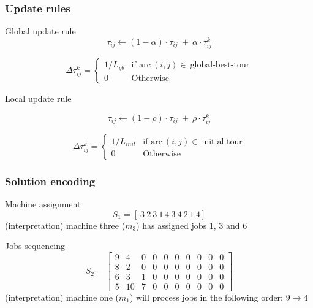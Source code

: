 \begin{frame} \frametitle{Update rules} 

\begin{block}{Global update rule}
\begin{equation*}
\tau_{ij} \leftarrow (1 - \alpha)\cdot\tau_{ij}~+~\alpha\cdot\tau_{ij}^{k}
\end{equation*}

\begin{equation*}
\Delta\tau_{ij}^{k} = 
\begin{cases} 
1/L_{gb} & \text{if arc}~(i,j)\in~\text{global-best-tour} \\
0		 & \text{Otherwise}
\end{cases}
\end{equation*}

\end{block}

\begin{block}{Local update rule}

\begin{equation*}
\tau_{ij} \leftarrow (1 - \rho)\cdot\tau_{ij}~+~\rho\cdot\tau_{ij}^{k}
\end{equation*}

\begin{equation*}
\Delta\tau_{ij}^{k} = 
\begin{cases} 
1/L_{init} 	& \text{if arc}~(i,j)\in~\text{initial-tour} \\
0    		& \text{Otherwise}
\end{cases}
\end{equation*}
\end{block}

\end{frame}


\begin{frame} \frametitle{Solution encoding} 

\begin{block}{Machine assignment}
\begin{equation} \label{eq:stage1} \tag{stage 1}
S_1 =[~3~2~3~1~4~3~4~2~1~4]
\end{equation}
(interpretation) machine three ($m_3$) has assigned jobs 1, 3 and 6
\end{block}

\begin{block}{Jobs sequencing}
\begin{equation}\label{eq:stage2} \tag{stage 2}
S_2 =
\begin{bmatrix}
9  &  4  &  0 &  0 &  0 &  0 &  0 &  0 &  0 &  0 \\
8  &  2  &  0 &  0 &  0 &  0 &  0 &  0 &  0 &  0 \\
6  &  3  &  1 &  0 &  0 &  0 &  0 &  0 &  0 &  0 \\
5  & 10  &  7 &  0 &  0 &  0 &  0 &  0 &  0 &  0 
\end{bmatrix}
\end{equation}	
(interpretation) machine one ($m_1$) will process jobs in the following order: $9 \rightarrow 4$
\end{block}

\end{frame}


